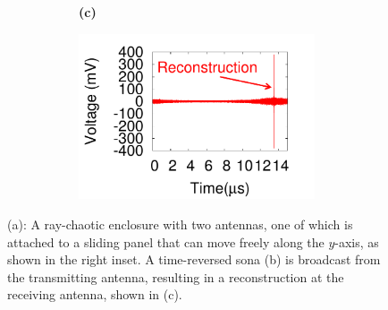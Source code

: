 \begin{figure}[]
\begin{subfigure}[]{0.9\columnwidth}
\begin{subfigure}[t]{0.45\columnwidth}
				\caption{\label{fig:sona}}
		\end{subfigure}
	\begin{subfigure}[t]{0.03\columnwidth}
	\textbf{(c)}
	\end{subfigure}
		\begin{subfigure}[t]{0.45\columnwidth}
				\centering
				\includegraphics[width=\columnwidth,valign=t]{figs/recon.pdf}
				\caption{\label{fig:recon}}
		\end{subfigure}
	\end{subfigure}
  \vspace{-1\baselineskip}
	\caption{(a): A ray-chaotic enclosure with two antennas, one of
	which is attached to a sliding panel that can move freely along the $y$-axis,
	as shown in the right inset. A time-reversed sona (b) is broadcast from the
	transmitting antenna, resulting in a reconstruction at the receiving
	antenna, shown in (c).}
	\label{fig:setup}
\vspace{-0.5\baselineskip}
\end{figure}


